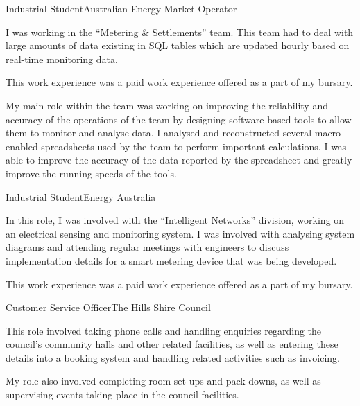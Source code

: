\begin{professionalExperience}
{    %
}

{Industrial Student}{Australian Energy Market Operator}
{I was working in the ``Metering \& Settlements'' team. This team had to deal
with large amounts of data existing in SQL tables which are updated hourly based
on real-time monitoring data.

This work experience was a paid work experience offered as a part of my
 bursary.

My main role within the team was working on improving the reliability and
accuracy of the operations of the team by designing software-based tools to
allow them to monitor and analyse data. I analysed and reconstructed several
macro-enabled spreadsheets used by the team to perform important calculations. I
was able to improve the accuracy of the data reported by the spreadsheet and
greatly improve the running speeds of the tools.}
{

}

{Industrial Student}{Energy Australia}
{In this role, I was involved with the ``Intelligent Networks'' division,
working on an electrical sensing and monitoring system. I was involved with
analysing system diagrams and attending regular meetings with engineers to
discuss implementation details for a smart metering device that was being
developed.

This work experience was a paid work experience offered as a part of my
 bursary.}
{}

{Customer Service Officer}{The Hills Shire Council}
{This role involved taking phone calls and handling enquiries regarding the
council's community halls and other related facilities, as well as entering
these details into a booking system and handling related activities such as
invoicing.

My role also involved completing room set ups and pack downs, as well as
supervising events taking place in the council facilities.}
{}


\end{professionalExperience}

